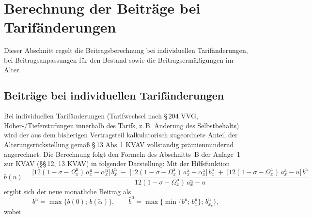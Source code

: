 \section{Berechnung der Beiträge bei Tarifänderungen}\label{sec:tarifaenderung}

Dieser Abschnitt regelt die Beitragsberechnung bei individuellen
Tarifänderungen, bei Beitragsanpassungen für den Bestand sowie die
Beitragsermäßigungen im Alter.

\subsection{Beiträge bei individuellen Tarifänderungen}\label{sec:umstufung}

Bei individuellen Tarifänderungen (Tarifwechsel nach \S\,204 VVG,
Höher-/Tieferstufungen innerhalb des Tarifs, z.\,B. Änderung des
Selbstbehalts) wird der aus dem bisherigen Vertragsteil kalkulatorisch
zugeordnete Anteil der Alterungsrückstellung gemäß \S\,13 Abs.\,1 KVAV
vollständig prämienmindernd angerechnet. Die Berechnung folgt den
Formeln des Abschnitts~B der Anlage~1 zur KVAV (\S\S\,12, 13 KVAV) in
folgender Darstellung: Mit der Hilfsfunktion
\begin{equation}
b(u) = \frac{\bigl[12(1-\sigma-\Omega^{\mathrm{n}}_x)\,a^{\mathrm{n}}_x - \alpha^{\mathrm{n}}_x\bigr]\, b^{\mathrm{n}}_x
      \;-\; \bigl[12(1-\sigma-\Omega^{\mathrm{a}}_x)\,a^{\mathrm{a}}_x - \alpha^{\mathrm{a}}_x\bigr]\, b^{\mathrm{a}}_x
      \;+\; \bigl[12(1-\sigma-\Omega^{\mathrm{a}}_x)\,a^{\mathrm{a}}_x - u\bigr]\, b^{\mathrm{a}}}
      {12(1-\sigma-\Omega^{\mathrm{n}}_x)\,a^{\mathrm{n}}_x - u}
\label{eq:umstufung}
\end{equation}
ergibt sich der neue monatliche Beitrag als
\begin{equation}
b^{\mathrm{n}} = \max\{b(0);\, b(\tilde{\alpha})\},
\qquad
\hat{b}^{\mathrm{n}} = \max\bigl\{\min\{b^{\mathrm{n}};\, b^{\mathrm{n}}_x\};\, b^{\mathrm{n}}_{x_e}\bigr\},
\label{eq:umstufung2}
\end{equation}
wobei
